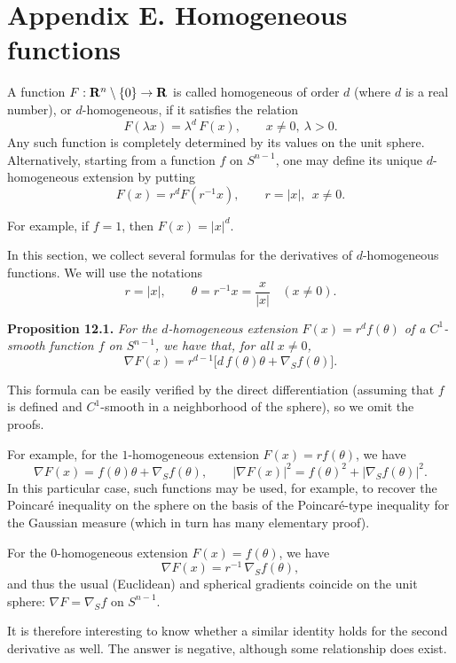 \documentclass[reqno,12pt]{amsart}
\theoremstyle{plain}
\begin{document}
\vskip10mm
\section{{\bf Appendix E. Homogeneous functions}}
\setcounter{equation}{0}

\vskip2mm
\noindent
A function $F: {{\bf R}}^n \setminus \{0\} \rightarrow {{\bf R}}$ is called homogeneous
of order $d$ (where $d$ is a real number), or $d$-homogeneous, if it 
satisfies the relation
$$
F(\lambda x) = \lambda^d\, F(x), \qquad x \neq 0, \ 
\lambda > 0.
$$
Any such function is completely determined by its values on the unit sphere.
Alternatively, starting from a function $f$ on $S^{n-1}$, one may define
its unique $d$-homogeneous extension by putting
$$
F(x) = r^d F(r^{-1} x), \qquad r = |x|, \ \ x \neq 0.
$$

For example, if $f = 1$, then $F(x) = |x|^d$.

In this section, we collect several formulas for the derivatives of 
$d$-homogeneous functions. We will use the notations
$$
r = |x|, \qquad \theta = r^{-1} x = \frac{x}{|x|} \ \ \ \ (x \neq 0).
$$

\vskip5mm
{\bf Proposition 12.1.} {\it For the $d$-homogeneous extension 
$F(x) = r^d f(\theta)$ of a $C^1$-smooth function $f$ on $S^{n-1}$, 
we have that, for all $x \neq 0$,
\begin{equation}
\nabla F(x) = r^{d-1} \big[d \, f(\theta)\theta + \nabla_S f(\theta)\big].
\end{equation}
}

\vskip2mm
This formula can be easily verified by the direct differentiation
(assuming that $f$ is defined and $C^1$-smooth in a neighborhood of the 
sphere), so we omit the proofs. 

For example, for the $1$-homogeneous extension $F(x) = r f(\theta)$, we have
$$
\nabla F(x) = f(\theta)\theta + \nabla_S f(\theta), \qquad
|\nabla F(x)|^2 = f(\theta)^2 + |\nabla_S f(\theta)|^2.
$$
In this particular case, such functions may be used, for example, to recover
the Poincar\'e inequality on the sphere on the basis of the Poincar\'e-type 
inequality for the Gaussian measure (which in turn has many elementary proof).

For the $0$-homogeneous extension $F(x) = f(\theta)$, we have
$$
\nabla F(x) = r^{-1}\,\nabla_S f(\theta), 
$$
and thus the usual (Euclidean) and spherical gradients coincide on the unit 
sphere: $\nabla F = \nabla_S f$ on $S^{n-1}$.

It is therefore interesting to know whether a similar identity
holds for the second derivative as well. The answer is negative,
although some relationship does exist.
\end{document}
